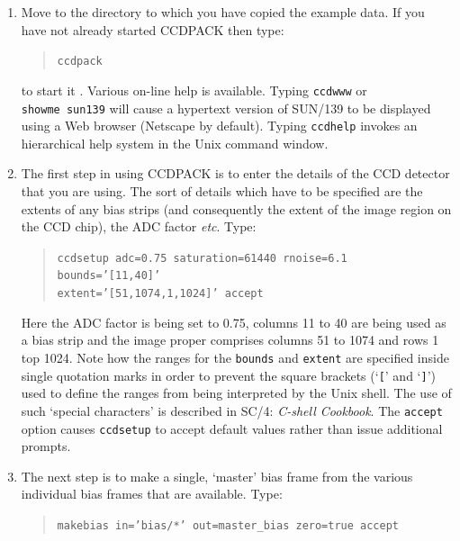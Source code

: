 \documentclass[twoside,11pt]{article}
\newcommand{\xref}[3]{#1}
\begin{document}
\begin{enumerate}

  \item Move to the directory to which you have copied the example data.
   If you have not already started CCDPACK then type:

  \begin{quote}
   {\tt ccdpack}
  \end{quote}

   to start it .  Various on-line help is available.  Typing {\tt ccdwww} or
   {\tt showme~sun139} will cause a hypertext version of
   \xref{SUN/139}{sun139}{} to be displayed using a Web browser (Netscape
   by default).  Typing {\tt ccdhelp}  invokes an hierarchical help
   system in the Unix command window.

  \item The first step in using CCDPACK is to enter the details of the
   CCD detector that you are using.  The sort of details which have to
   be specified are the extents of any bias strips (and consequently the
   extent of the image region on the CCD chip), the ADC factor \emph{etc}.
   Type:

  \begin{quote}
   {\tt ccdsetup adc=0.75 saturation=61440 rnoise=6.1 bounds='[11,40]' \\
    \hspace*{3mm} extent='[51,1074,1,1024]' accept}
  \end{quote}

   Here the ADC factor is being set to 0.75, columns 11 to 40 are being
   used as a bias strip and the image proper comprises columns 51 to
   1074 and rows 1 top 1024.  Note how the ranges for the {\tt bounds}
   and {\tt extent} are specified inside single quotation marks in
   order to prevent the square brackets (`{\tt [}' and `{\tt ]}')
   used to define the ranges from being interpreted by the Unix shell.
   The use of such `special characters' is described in \xref{SC/4:
   {\it C-shell Cookbook}\/}{sc4}{}\cite{SC4}.  The {\tt accept} option
   causes {\tt ccdsetup} to accept default values rather than issue
   additional prompts.

  \item The next step is to make a single, `master' bias frame from the
   various individual bias frames that are available.  Type:

  \begin{quote}
   {\tt makebias in='bias/*' out=master\_bias zero=true accept}
  \end{quote}


\end{enumerate}
\end{document}
